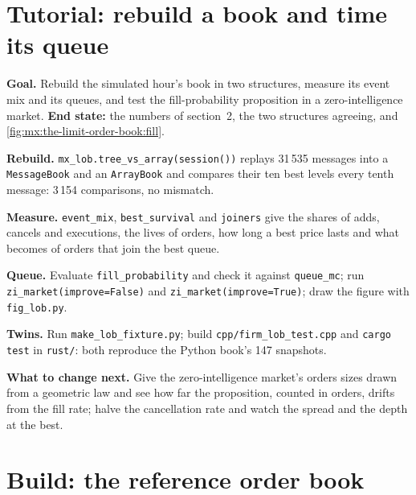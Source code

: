 \section{Tutorial: rebuild a book and time its queue}\label{tut:mx:the-limit-order-book:tut}

\begin{tutorial}
\textbf{Goal.} Rebuild the simulated hour's book in two structures, measure its event mix and its queues, and test the fill-probability
proposition in a zero-intelligence market. \textbf{End state:} the numbers of section~2, the two structures agreeing, and
\cref{fig:mx:the-limit-order-book:fill}.
\begin{tutsteps}
\item \textbf{Rebuild.} \texttt{mx\_lob.tree\_vs\_array(session())} replays 31\,535 messages into a \texttt{MessageBook} and an \texttt{ArrayBook} and
compares their ten best levels every tenth message: 3\,154 comparisons, no mismatch.
\item \textbf{Measure.} \texttt{event\_mix}, \texttt{best\_survival} and \texttt{joiners} give the shares of adds, cancels and executions, the lives of
orders, how long a best price lasts and what becomes of orders that join the best queue.
\item \textbf{Queue.} Evaluate \texttt{fill\_probability} and check it against \texttt{queue\_mc}; run \texttt{zi\_market(improve=False)} and
\texttt{zi\_market(improve=True)}; draw the figure with \texttt{fig\_lob.py}.
\item \textbf{Twins.} Run \texttt{make\_lob\_fixture.py}; build \texttt{cpp/firm\_lob\_test.cpp} and \texttt{cargo test} in \texttt{rust/}: both reproduce
the Python book's 147 snapshots.
\end{tutsteps}
\textbf{What to change next.} Give the zero-intelligence market's orders sizes drawn from a geometric law and see how far the proposition, counted in
orders, drifts from the fill rate; halve the cancellation rate and watch the spread and the depth at the best.
\end{tutorial}

\section{Build: the reference order book}\label{bld:mx:the-limit-order-book:lob}

